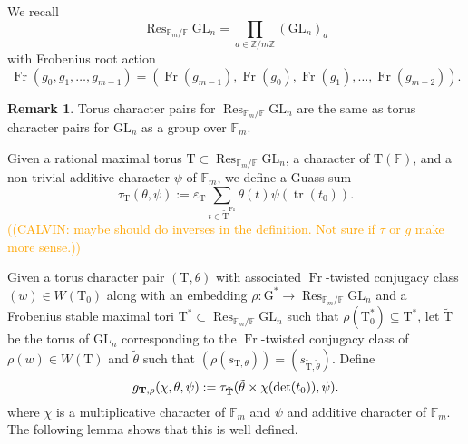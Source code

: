 \documentclass[12pt, reqno]{amsart}
\theoremstyle{definition}
\theoremstyle{definition}
\newtheorem{remark}[theorem]{Remark}
\theoremstyle{definition}
\newcommand{\trace}{\operatorname{tr}}
\newcommand{\GL}{\mathrm{GL}}
\newcommand{\finiteField}{\mathbb{F}}
\newcommand{\finiteFieldExtension}[1]{\finiteField_{#1}}
\newcommand{\Frobenius}{\operatorname{Fr}}
\newcommand{\restrictionOfScalars}[3]{\operatorname{Res}_{#1 \slash #2}{#3}}
\newcommand{\algebraicGroup}[1]{\boldsymbol{\mathrm{#1}}}
\newcommand{\calvin}[1]{\textcolor{orange}{\sffamily ((CALVIN: #1))}}
\begin{document}
We recall\[
	\restrictionOfScalars{\finiteFieldExtension{m}}{\finiteField}{\algebraicGroup{\GL}_n} = \prod_{a \in \mathbb{Z}/m\mathbb{Z}} \left(\algebraicGroup{\GL}_n\right)_a
\]
with Frobenius root action $$\Frobenius(g_0,g_1, \hdots, g_{m-1}) = (\Frobenius(g_{m-1}), \Frobenius(g_0), \Frobenius(g_1), \hdots, \Frobenius(g_{m-2})).$$

\begin{remark}
Torus character pairs for $\restrictionOfScalars{\finiteFieldExtension{m}}{\finiteField}{\algebraicGroup{\GL}_n}$ are the same as torus character pairs for $\algebraicGroup{\GL}_n$ as a group over $\finiteFieldExtension{m}$.
\end{remark}

Given a rational maximal torus $\algebraicGroup{T} \subset \restrictionOfScalars{\finiteFieldExtension{m}}{\finiteField}{\algebraicGroup{\GL}_n}$, a character of $\algebraicGroup{T}(\mathbb{F})$, and a non-trivial additive character $\psi$ of $\finiteFieldExtension{m}$, we define a Guass sum
\[
	\tau_{\algebraicGroup{T}}(\theta,\psi) := \varepsilon_{\algebraicGroup{
    \algebraicGroup{T}}}\sum_{t\in \tilde{\algebraicGroup{T}}^{\Frobenius}} \theta(t)\psi(\trace(t_0)).
\]
\calvin{maybe should do inverses in the definition. Not sure if $\tau$ or $g$ make more sense.}

Given a torus character pair $(\algebraicGroup{T},\theta)$ with associated $\Frobenius$-twisted conjugacy class $(w) \in W(\algebraicGroup{T}_0)$ along with an embedding $\rho:\algebraicGroup{G}^* \to \restrictionOfScalars{\finiteFieldExtension{m}}{\finiteField}{\algebraicGroup{\GL}_n}$ and a Frobenius stable maximal tori $\algebraicGroup{T}^* \subset \restrictionOfScalars{\finiteFieldExtension{m}}{\finiteField}{\algebraicGroup{\GL}_n}$ such that $\rho(\algebraicGroup{T}_0^*) \subseteq \algebraicGroup{T}^*$, let $\tilde{\algebraicGroup{T}}$ be the torus of $\algebraicGroup{\GL}_n$ corresponding to the $\Frobenius$-twisted conjugacy class of $\rho(w) \in W(\algebraicGroup{T})$ and $\tilde{\theta}$ such that $(\rho(s_{\algebraicGroup{T},\theta})) = (s_{\tilde{\algebraicGroup{T}},\tilde{\theta}})$. Define
\[
    g_{\algebraicGroup{T},\rho}(\chi,\theta,\psi) := \tau_{\Tilde{\algebraicGroup{T}}}(\tilde{\theta} \times \chi(\det(t_0)),\psi).
\]
where $\chi$ is a multiplicative character of $\finiteFieldExtension{m}$ and $\psi$ and additive character of $\finiteFieldExtension{m}$.
The following lemma shows that this is well defined.
\end{document}
